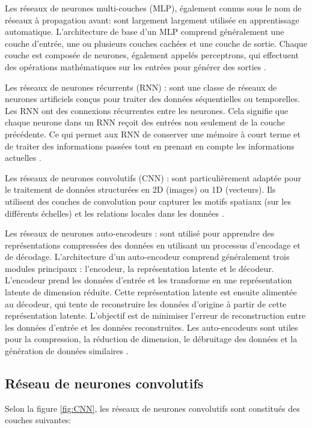 \begin{outline}
\1  Les réseaux de neurones multi-couches (MLP), également connus sous le nom de réseaux à propagation avant: sont largement largement utilisée en apprentissage automatique. L'architecture de base d'un MLP comprend généralement une couche d'entrée, une ou plusieurs couches cachées et une couche de sortie. Chaque couche est composée de neurones, également appelés perceptrons, qui effectuent des opérations mathématiques sur les entrées pour générer des sorties \cite{MLP_simon2004machine}.

\1  Les réseaux de neurones récurrents (RNN) : sont une classe de réseaux de neurones artificiels conçus pour traiter des données séquentielles ou temporelles. Les RNN ont des connexions récurrentes entre les neurones. Cela signifie que chaque neurone dans un RNN reçoit des entrées non seulement de la couche précédente. Ce qui permet aux RNN de conserver une mémoire à court terme et de traiter des informations passées tout en prenant en compte les informations actuelles \cite{RNN_goodfellow2016deep}.

\1  Les réseaux de neurones convolutifs (CNN) : sont particulièrement adaptée pour le traitement de données structurées en 2D (images) ou 1D (vecteurs). 
Ils utilisent des couches de convolution pour capturer les motifs spatiaux (sur les différents échelles) et les relations locales dans les données \cite{CNN_lecun1998gradient}.

\1  Les réseaux de neurones auto-encodeurs : sont utilisé pour apprendre des représentations compressées des données en utilisant un processus d'encodage et de décodage. L'architecture d'un auto-encodeur comprend généralement trois modules principaux : l'encodeur, la représentation latente et le décodeur. L'encodeur prend les données d'entrée et les transforme en une représentation latente de dimension réduite. Cette représentation latente est ensuite alimentée au décodeur, qui tente de reconstruire les données d'origine à partir de cette représentation latente. L'objectif est de minimiser l'erreur de reconstruction entre les données d'entrée et les données reconstruites. Les auto-encodeurs sont utiles pour la compression, la réduction de dimension, le débruitage des données et la génération de données similaires \cite{auto-encodeurs_hinton2006reducing}.

\end{outline}

\subsection{Réseau de neurones convolutifs}
Selon la figure \ref{fig:CNN}, les réseaux de neurones convolutifs sont constitués des couches suivantes:

